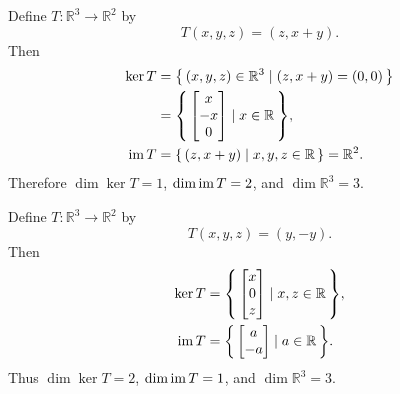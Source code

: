\begin{Example}
Define $T\colon\mathbb R^3\to\mathbb R^2$ by
\begin{equation*}
T(x,y,z)=(z,x+y).
\end{equation*}
Then
\begin{align*}
\ker T
 &=\qty{\, (x,y,z)\in\mathbb R^3 \mid (z,x+y)=(0,0) \,}\\
 &=\qty{\, \begin{bmatrix}x\\-x\\0\end{bmatrix} \mid x\in\mathbb R \,},\\
\operatorname{im} T
 &=\qty{\, (z,x+y) \mid x,y,z\in\mathbb R\,}=\mathbb R^2.
\end{align*}
Therefore $\dim\ker T=1$, $\dim\operatorname{im} T=2$, and $\dim\mathbb R^3=3$.
\end{Example}

\begin{Example}
Define $T\colon\mathbb R^3\to\mathbb R^2$ by
\begin{equation*}
T(x,y,z)=(y,-y).
\end{equation*}
Then
\begin{align*}
\ker T&=\qty{\, \begin{bmatrix}x\\0\\z\end{bmatrix} \mid x,z\in\mathbb R \,},\\
\operatorname{im} T&=\qty{\, \begin{bmatrix}a\\-a\end{bmatrix} \mid a\in\mathbb R \,}.
\end{align*}
Thus $\dim\ker T=2$, $\dim\operatorname{im} T=1$, and $\dim\mathbb R^3=3$.
\end{Example}


